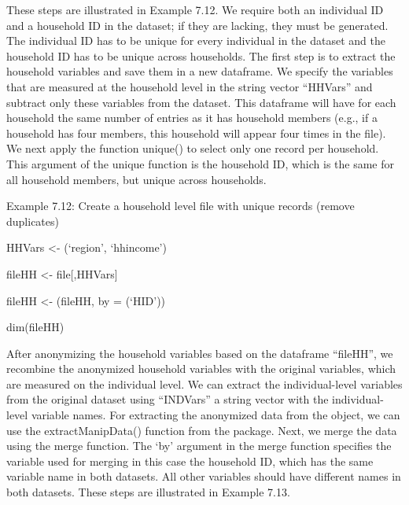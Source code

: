 \documentclass[letterpaper,10pt,english]{sphinxmanual}
\begin{document}
These steps are illustrated in Example 7.12. We require both an
individual ID and a household ID in the dataset; if they are lacking,
they must be generated. The individual ID has to be unique for every
individual in the dataset and the household ID has to be unique across
households. The first step is to extract the household variables and
save them in a new dataframe. We specify the variables that are measured
at the household level in the string vector “HHVars” and subtract only
these variables from the dataset. This dataframe will have for each
household the same number of entries as it has household members (e.g.,
if a household has four members, this household will appear four times
in the file). We next apply the function unique() to select only one
record per household. This argument of the unique function is the
household ID, which is the same for all household members, but unique
across households.

Example 7.12: Create a household level file with unique records (remove
duplicates)


\begin{DUlineblock}{0em}
\item[] HHVars \textless{}- (‘region’, ‘hhincome’)
\item[] fileHH \textless{}- file{[},HHVars{]}
\item[] 
\item[] fileHH \textless{}- (fileHH, by = (‘HID’))
\end{DUlineblock}

\begin{DUlineblock}{0em}
\item[] 
\item[] dim(fileHH)
\end{DUlineblock}

After anonymizing the household variables based on the dataframe
“fileHH”, we recombine the anonymized household variables with the
original variables, which are measured on the individual level. We can
extract the individual-level variables from the original dataset using
“INDVars” \textendash{} a string vector with the individual-level variable names.
For extracting the anonymized data from the  object, we can
use the extractManipData() function from the  package. Next,
we merge the data using the merge function. The ‘by’ argument in the
merge function specifies the variable used for merging \textendash{} in this case
the household ID, which has the same variable name in both datasets. All
other variables should have different names in both datasets. These
steps are illustrated in Example 7.13.
\end{document}
